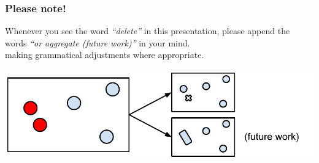\documentclass{beamer}
\begin{document}


\frame
{
  \frametitle{Please note!}
  Whenever you see the word \emph{``delete''} in this presentation, please append the words \emph{``or aggregate (future work)''} in your mind. \\
  making grammatical adjustments where appropriate.
  
  \begin{center}
  \includegraphics[scale=0.50]{figs/cvl-delete-aggregate.pdf}
  \end{center}

}
\end{document}
